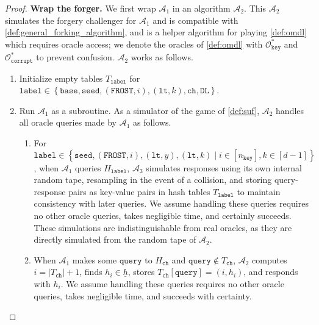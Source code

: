 \documentclass[11pt]{article}
\theoremstyle{definition}
\newcommand{\lt}{\texttt{lt}}
\newcommand{\corruptionOracle}{\mathcal{O}_{\texttt{corrupt}}}
\newcommand{\keyOracle}{\mathcal{O}_{\texttt{key}}}
\begin{document}
\begin{proof}
\textbf{Wrap the forger.}  We first wrap $\mathcal{A}_1$ in an algorithm $\mathcal{A}_2$. This $\mathcal{A}_2$ simulates the forgery challenger for $\mathcal{A}_1$ and is compatible with \cref{def:general_forking_algorithm}, and is a helper algorithm for playing \cref{def:omdl} which requires oracle access; we denote the oracles of \cref{def:omdl} with $\keyOracle^*$ and $\corruptionOracle^*$ to prevent confusion. $\mathcal{A}_2$ works as follows. 
\begin{enumerate}
\item Initialize empty tables $T_{\texttt{label}}$ for $\texttt{label} \in \left\{\texttt{base}, \texttt{seed}, (\texttt{FROST},i), (\lt, k), \texttt{ch}, \texttt{DL}\right\}$.
\item Run $\mathcal{A}_1$ as a subroutine. As a simulator of the game of \cref{def:suf}, $\mathcal{A}_2$ handles all oracle queries made by $\mathcal{A}_1$ as follows.
\begin{enumerate}
\item For $\texttt{label} \in \left\{\texttt{seed}, (\texttt{FROST},i), (\lt, y), (\lt, k) \mid i \in [n_{\texttt{key}}], k \in [d-1]\right\}$, when $\mathcal{A}_1$ queries $H_{\texttt{label}}$, $\mathcal{A}_3$ simulates responses using its own internal random tape, resampling in the event of a collision, and storing query-response pairs as key-value pairs in hash tables $T_{\texttt{label}}$ to maintain consistency with later queries. We assume handling these queries requires no other oracle queries, takes negligible time, and certainly succeeds. These simulations are indistinguishable from real oracles, as they are directly simulated from the random tape of $\mathcal{A}_2$.


\item When $\mathcal{A}_1$ makes some $\texttt{query}$ to $H_{\texttt{ch}}$ and $\texttt{query} \notin T_{\texttt{ch}}$, $\mathcal{A}_2$ computes $i = \left|T_{\texttt{ch}}\right|+1$, finds $h_i \in \underline{h}$, stores $T_{\texttt{ch}}[\texttt{query}] = (i, h_i)$, and responds with $h_i$.  We assume handling these queries requires no other oracle queries, takes negligible time, and succeeds with certainty.


\end{enumerate}
\end{enumerate}
\end{proof}
\end{document}
